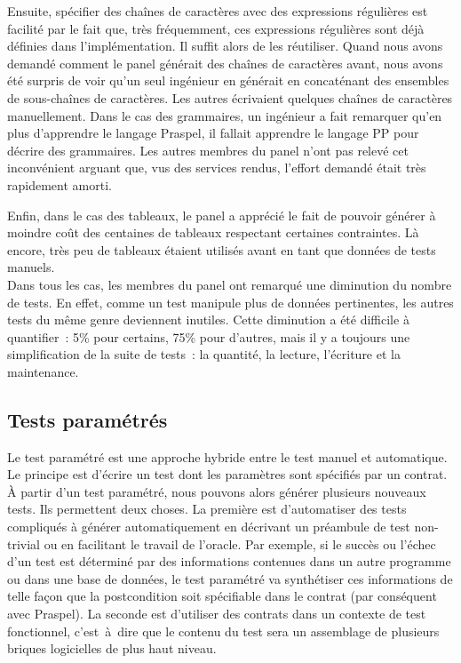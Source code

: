 Ensuite, spécifier des chaînes de caractères avec des expressions régulières est
facilité par le fait que, très fréquemment, ces expressions régulières sont déjà
définies dans l'implémentation. Il suffit alors de les réutiliser. Quand nous
avons demandé comment le panel générait des chaînes de caractères avant, nous
avons été surpris de voir qu'un seul ingénieur en générait en concaténant des
ensembles de sous-chaînes de caractères. Les autres écrivaient quelques chaînes
de caractères manuellement. Dans le cas des grammaires, un ingénieur a fait
remarquer qu'en plus d'apprendre le langage Praspel, il fallait apprendre le
langage PP pour décrire des grammaires. Les autres membres du panel n'ont pas
relevé cet inconvénient arguant que, vus des services rendus, l'effort demandé
était très rapidement amorti.

Enfin, dans le cas des tableaux, le panel a apprécié le fait de pouvoir générer
à moindre coût des centaines de tableaux respectant certaines contraintes. Là
encore, très peu de tableaux étaient utilisés avant en tant que données de tests
manuels. \\

Dans tous les cas, les membres du panel ont remarqué une diminution du nombre de
tests. En effet, comme un test manipule plus de données pertinentes, les autres
tests du même genre deviennent inutiles. Cette diminution a été difficile à
quantifier~: 5\% pour certains, 75\% pour d'autres, mais il y a toujours une
simplification de la suite de tests~: la quantité, la lecture, l'écriture et la
maintenance.

\subsection{Tests paramétrés}
\label{subsection:experimentation:parameterized}


Le test paramétré est une approche hybride entre le test manuel et automatique.
Le principe est d'écrire un test dont les paramètres sont spécifiés par un
contrat. À partir d'un test paramétré, nous pouvons alors générer plusieurs
nouveaux tests. Ils permettent deux choses. La première est d'automatiser des
tests compliqués à générer automatiquement en décrivant un préambule de test
non-trivial ou en facilitant le travail de l'oracle. Par exemple, si le succès
ou l'échec d'un test est déterminé par des informations contenues dans un autre
programme ou dans une base de données, le test paramétré va synthétiser ces
informations de telle façon que la postcondition soit spécifiable dans le
contrat (par conséquent avec Praspel). La seconde est d'utiliser des contrats
dans un contexte de test fonctionnel, c'est~à~dire que le contenu du test sera
un assemblage de plusieurs briques logicielles de plus haut niveau.

